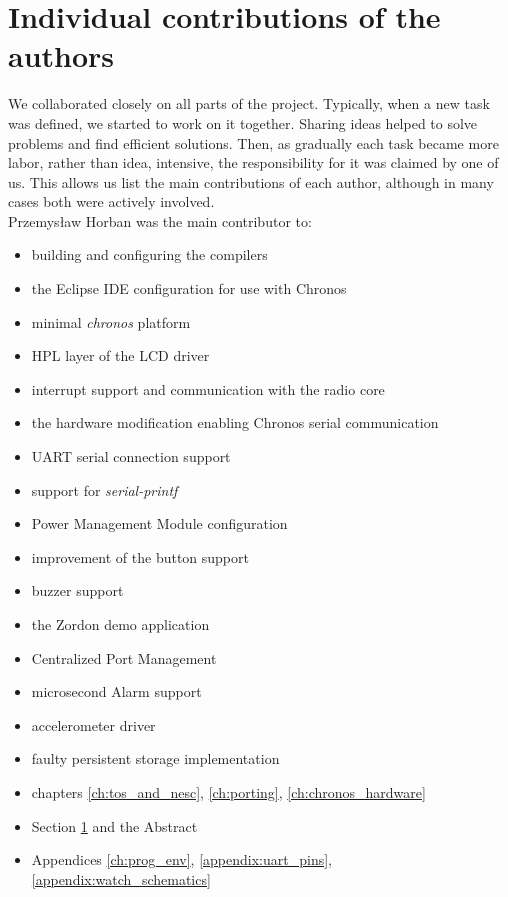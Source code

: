 \section{Individual contributions of the authors}
\label{ch:contributions}

We collaborated closely on all parts of the project. Typically, when a new task was defined, we started to work on it together. Sharing ideas helped to solve problems and find efficient solutions. Then, as gradually each task became more labor, rather than idea, intensive, the responsibility for it was claimed by one of us. This allows us list the main contributions of each author, although in many cases both were actively involved.\\
Przemysław Horban was the main contributor to:
\begin{itemize}\addtolength{\itemsep}{-.35\baselineskip} 
  \item building and configuring the compilers
  \item the Eclipse IDE configuration for use with Chronos
  \item minimal \emph{chronos} platform
  \item HPL layer of the LCD driver
  \item interrupt support and communication with the radio core
  \item the hardware modification enabling Chronos serial communication
  \item UART serial connection support
  \item support for \emph{serial-printf}
  \item Power Management Module configuration
  \item improvement of the button support
  \item buzzer support
  \item the Zordon demo application
  \item Centralized Port Management
  \item microsecond Alarm support
  \item accelerometer driver
  \item faulty persistent storage implementation
  \item chapters \ref{ch:tos_and_nesc}, \ref{ch:porting}, \ref{ch:chronos_hardware}
  \item Section \ref{ch:contributions} and the Abstract
  \item Appendices \ref{ch:prog_env}, \ref{appendix:uart_pins}, \ref{appendix:watch_schematics}
\end{itemize}
